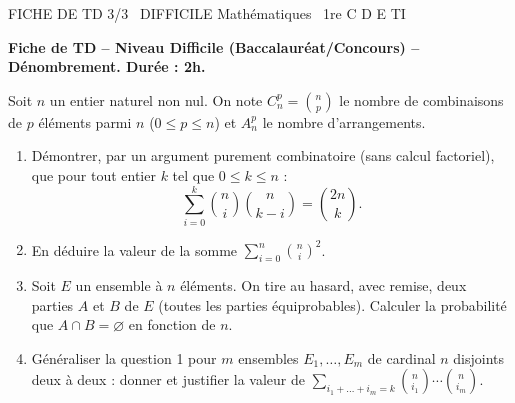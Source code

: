 \documentclass[11pt]{article}
\begin{document}
\begin{tcolorbox}[enhanced,colback=popink,colframe=popink,arc=10pt,boxrule=0pt,left=12pt,right=12pt,top=9pt,bottom=9pt]
{\color{white}\popxbold\small FICHE DE TD 3/3 \textbullet\ DIFFICILE \hfill Mathématiques \textbullet\ 1re C D E TI\par}
\end{tcolorbox}
\vspace{4pt}
\noindent\textbf{Fiche de TD -- Niveau Difficile (Baccalauréat/Concours) -- Dénombrement. Durée : 2h.}\vspace{0.5em}

\begin{exercice}
Soit $n$ un entier naturel non nul. On note $C_n^p = \binom{n}{p}$ le nombre de combinaisons de $p$ éléments parmi $n$ ($0 \le p \le n$) et $A_n^p$ le nombre d'arrangements.
\begin{enumerate}
    \item Démontrer, par un argument purement combinatoire (sans calcul factoriel), que pour tout entier $k$ tel que $0 \le k \le n$ :
    \[
    \sum_{i=0}^{k} \binom{n}{i}\binom{n}{k-i} = \binom{2n}{k}.
    \]
    \item En déduire la valeur de la somme $\displaystyle\sum_{i=0}^{n} \binom{n}{i}^2$.
    \item Soit $E$ un ensemble à $n$ éléments. On tire au hasard, avec remise, deux parties $A$ et $B$ de $E$ (toutes les parties équiprobables). Calculer la probabilité que $A \cap B = \varnothing$ en fonction de $n$.
    \item Généraliser la question 1 pour $m$ ensembles $E_1, \dots, E_m$ de cardinal $n$ disjoints deux à deux : donner et justifier la valeur de $\displaystyle\sum_{i_1+\dots+i_m=k} \binom{n}{i_1}\cdots\binom{n}{i_m}$.
\end{enumerate}
\end{exercice}
\end{document}
